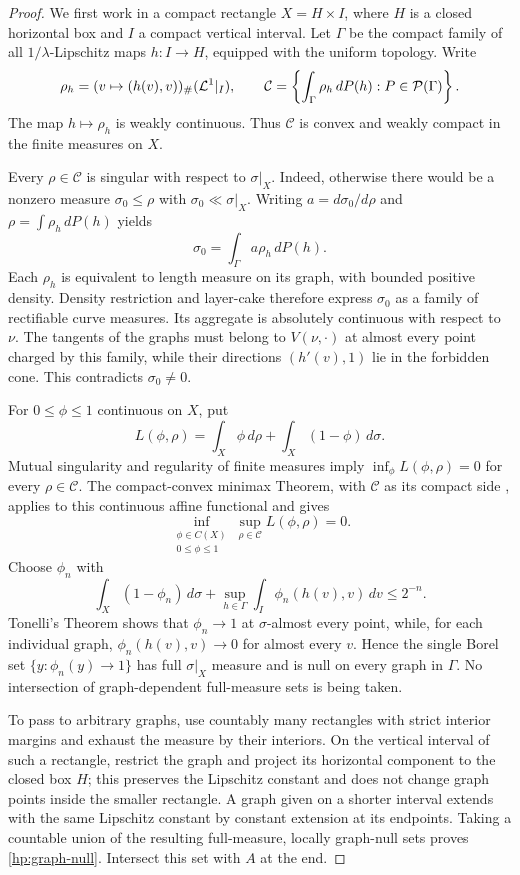 \begin{proof}
We first work in a compact rectangle $X=H\times I$, where $H$ is a
closed horizontal box and $I$ a compact vertical interval.  Let
$\Gamma$ be the compact family of all $1/\lambda$-Lipschitz maps
$h:I\to H$, equipped with the uniform topology.  Write
\[
 \rho_h=(v\mapsto(h(v),v))_\#(\mathcal L^1\vert_I),
 \qquad
 \mathcal C=\left\{\int_\Gamma\rho_h\,dP(h):
                         P\in\mathcal P(\Gamma)\right\}.
\]
The map $h\mapsto\rho_h$ is weakly continuous.  Thus $\mathcal C$
is convex and weakly compact in the finite measures on $X$.

Every $\rho\in\mathcal C$ is singular with respect to
$\sigma\vert_X$.  Indeed, otherwise there would be a nonzero measure
$\sigma_0\le\rho$ with $\sigma_0\ll\sigma\vert_X$.  Writing
$a=d\sigma_0/d\rho$ and $\rho=\int\rho_h\,dP(h)$ yields
\[
 \sigma_0=\int_\Gamma a\rho_h\,dP(h).
\]
Each $\rho_h$ is equivalent to length measure on its graph, with
bounded positive density.  Density restriction and layer-cake
therefore express $\sigma_0$ as a family of rectifiable curve measures.
Its aggregate is absolutely continuous with respect to $\nu$.
The tangents of the graphs must belong to $V(\nu,\cdot)$ at almost
every point charged by this family, while their directions
$(h'(v),1)$ lie in the forbidden cone.  This contradicts
$\sigma_0\ne0$.

For $0\le\phi\le1$ continuous on $X$, put
\[
 L(\phi,\rho)=\int_X\phi\,d\rho
                 +\int_X(1-\phi)\,d\sigma.
\]
Mutual singularity and regularity of finite measures imply
$\inf_\phi L(\phi,\rho)=0$ for every $\rho\in\mathcal C$.
The compact-convex minimax Theorem, with $\mathcal C$ as its compact
side \cite[Theorem~4.2]{Sion1958}, applies to this continuous affine functional
and gives
\[
 \inf_{\substack{\phi\in C(X)\\0\le\phi\le1}}
     \sup_{\rho\in\mathcal C}L(\phi,\rho)=0.
\]
Choose $\phi_n$ with
\[
 \int_X(1-\phi_n)\,d\sigma
       +\sup_{h\in\Gamma}\int_I\phi_n(h(v),v)\,dv
 \le2^{-n}.
\]
Tonelli's Theorem shows that $\phi_n\to1$ at $\sigma$-almost every
point, while, for each individual graph, $\phi_n(h(v),v)\to0$
for almost every $v$.  Hence the single Borel set
$\{y:\phi_n(y)\to1\}$ has full $\sigma\vert_X$ measure and is
null on every graph in $\Gamma$.  No intersection of graph-dependent
full-measure sets is being taken.

To pass to arbitrary graphs, use countably many rectangles with
strict interior margins and exhaust the measure by their interiors.
On the vertical interval of such a rectangle, restrict the graph
and project its horizontal component to the closed box $H$; this
preserves the Lipschitz constant and does not change graph points
inside the smaller rectangle.  A graph given on a shorter interval
extends with the same Lipschitz constant by constant extension at its
endpoints.  Taking a countable union of the resulting full-measure,
locally graph-null sets proves \eqref{hp:graph-null}.  Intersect this
set with $A$ at the end.
\end{proof}

